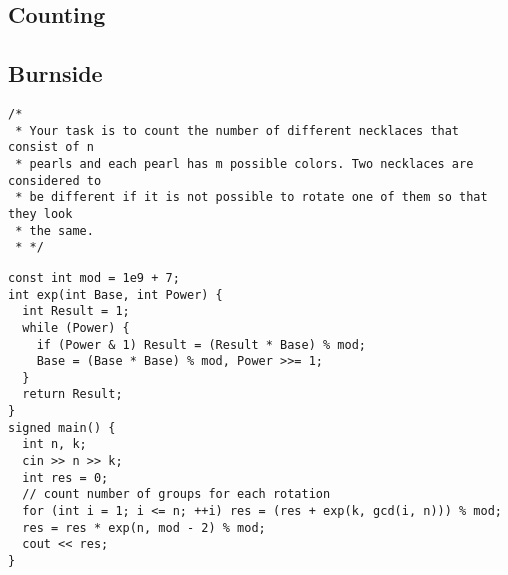 \documentclass[twoside]{article}
\begin{document}
\begin{multicols*}{2}
{
\section*{Counting}
}
{
\subsection*{Burnside}
}
\begin{verbatim}
/*
 * Your task is to count the number of different necklaces that consist of n
 * pearls and each pearl has m possible colors. Two necklaces are considered to
 * be different if it is not possible to rotate one of them so that they look
 * the same.
 * */
\end{verbatim}
\vspace{-12pt}
\begin{verbatim}
const int mod = 1e9 + 7;
int exp(int Base, int Power) {
  int Result = 1;
  while (Power) {
    if (Power & 1) Result = (Result * Base) % mod;
    Base = (Base * Base) % mod, Power >>= 1;
  }
  return Result;
}
signed main() {
  int n, k;
  cin >> n >> k;
  int res = 0;
  // count number of groups for each rotation
  for (int i = 1; i <= n; ++i) res = (res + exp(k, gcd(i, n))) % mod;
  res = res * exp(n, mod - 2) % mod;
  cout << res;
}
\end{verbatim}

{
}
\end{multicols*}
\end{document}

